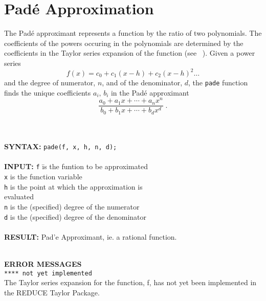 \section{Pad\'{e} Approximation}


The Pad\'{e} approximant represents a function by the ratio of two 
polynomials. The coefficients of the powers occuring in the polynomials 
are determined by the coefficients in the Taylor series
expansion of the function (see ~\cite{PA}). Given a power series
\[ f(x) = c_0 + c_1 (x-h) + c_2 (x-h)^2 \ldots \]
and the degree of numerator, $n$, and of the denominator, $d$,
the {\tt pade} function finds the unique coefficients 
$a_i,\, b_i$ in the Pad\'{e} approximant 
\[ \frac{a_0+a_1 x+ \cdots + a_n x^n}{b_0+b_1 x+ \cdots + b_d x^d} \; .\]
\\ \\

\begin{tabbing}
{\bf SYNTAX:} \hspace{5mm}\= {\tt pade(f, x, h, n, d);}\\ \\

{\bf INPUT:}
\> {\tt f} \hspace{3mm} \= is the funtion to be approximated\\
\> {\tt x}             \> is the function variable\\
\> {\tt h}             \> is the point at which the approximation is\\ 
\>                     \> evaluated\\
\> {\tt n}             \> is the (specified) degree of the numerator\\
\> {\tt d}             \> is the (specified) degree of the denominator\\ \\


{\bf RESULT:} 
\> Pad\a'{e} Approximant, ie. a rational function.\\ \\
\end{tabbing}


{\bf ERROR MESSAGES}\\

{\tt ***** not yet implemented}\\

The Taylor series expansion for the function, f, has not yet
been implemented in the {\small REDUCE} Taylor Package.\\ \\


